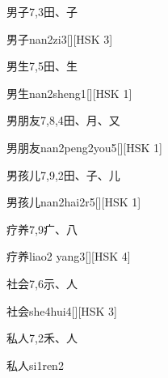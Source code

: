 \begin{entry}{男子}{7,3}{⽥、⼦}
  \begin{phonetics}{男子}{nan2zi3}[][HSK 3]
  \end{phonetics}
\end{entry}

\begin{entry}{男生}{7,5}{⽥、⽣}
  \begin{phonetics}{男生}{nan2sheng1}[][HSK 1]
  \end{phonetics}
\end{entry}

\begin{entry}{男朋友}{7,8,4}{⽥、⽉、⼜}
  \begin{phonetics}{男朋友}{nan2peng2you5}[][HSK 1]
  \end{phonetics}
\end{entry}

\begin{entry}{男孩儿}{7,9,2}{⽥、⼦、⼉}
  \begin{phonetics}{男孩儿}{nan2hai2r5}[][HSK 1]
  \end{phonetics}
\end{entry}

\begin{entry}{疗养}{7,9}{⽧、⼋}
  \begin{phonetics}{疗养}{liao2 yang3}[][HSK 4]
  \end{phonetics}
\end{entry}

\begin{entry}{社会}{7,6}{⽰、⼈}
  \begin{phonetics}{社会}{she4hui4}[][HSK 3]
  \end{phonetics}
\end{entry}

\begin{entry}{私人}{7,2}{⽲、⼈}
  \begin{phonetics}{私人}{si1ren2}
  \end{phonetics}
\end{entry}

